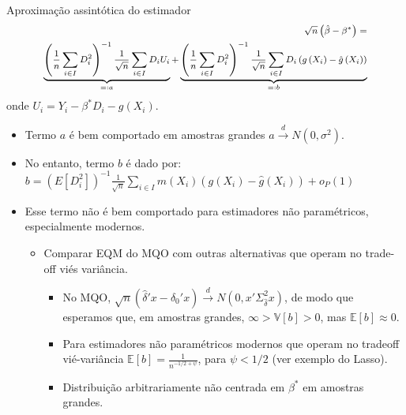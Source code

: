 \documentclass[11pt]{beamer}
\begin{document}
	\begin{frame}{Aproximação assintótica do estimador}
		\begin{equation*}
			\footnotesize 
			\begin{aligned}
						\sqrt{n}\left(\hat{\beta}-\beta^*\right)=\\ \underbrace{\left(\frac{1}{n} \sum_{i \in I} D_{i}^{2}\right)^{-1} \frac{1}{\sqrt{n}} \sum_{i \in I} D_{i} U_{i}}_{=:a}+\underbrace{\left(\frac{1}{n} \sum_{i \in I} D_{i}^{2}\right)^{-1} \frac{1}{\sqrt{n}} \sum_{i \in I} D_{i}\left(g\left(X_{i}\right)-\hat{g}\left(X_{i}\right)\right)}_{=:b}
			\end{aligned}
		\end{equation*}
						onde $U_i = Y_i - \beta^* D_i - g(X_i)$.

		\begin{itemize}
			\item Termo $a$ é bem comportado em amostras grandes $a\overset{d}{\to} N(0,\sigma^2)$.
			\item No entanto, termo $b$ é dado por:
			\(b=\left(E\left[D_{i}^{2}\right]\right)^{-1} \frac{1}{\sqrt{n}} \sum_{i \in I} m\left(X_{i}\right)\left(g\left(X_{i}\right)-\hat{g}\left(X_{i}\right)\right)+o_{P}(1)\)
			\item Esse termo não é bem comportado para estimadores não paramétricos, especialmente modernos.
			\begin{itemize}
				\item Comparar EQM do MQO com outras alternativas que operam no trade-off viés variância.
				\begin{itemize}
				\item No MQO, $\sqrt{n}(\hat{\delta}'x - \delta_0'x) \overset{d}{\to}N(0, x'\Sigma^2_{\hat{\delta}}x)$, de modo que esperamos que, em amostras grandes, $\infty>\mathbb{V}[b] > 0$, mas $\mathbb{E}[b]\approx 0$.
				\item Para estimadores não paramétricos modernos que operam no tradeoff vié-variância $\mathbb{E}[b] = \frac{1}{n^{-1/2 + \psi}}$, para $\psi < 1/2$ (ver exemplo do Lasso). 
				\item Distribuição arbitrariamente não centrada em $\beta^*$ em amostras grandes.
				 \end{itemize}
			\end{itemize}
		\end{itemize}
	\end{frame}
	
\end{document}
